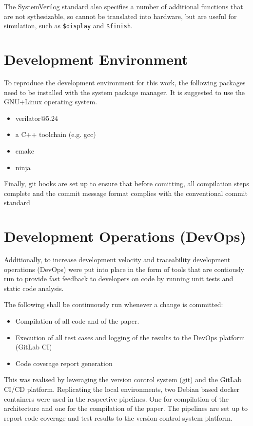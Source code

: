 The SystemVerilog standard also specifies a number of additional functions that are not sythesizable, so cannot be translated into hardware, but are useful for simulation, such as \texttt{\$display} and \texttt{\$finish}.

\section{Development Environment}
To reproduce the development environment for this work, the following packages need to be installed with the system package manager. It is suggested to use the GNU+Linux operating system. 

\begin{itemize}
  \item verilator@5.24
  \item a C++ toolchain (e.g. gcc)
  \item cmake
  \item ninja
\end{itemize}
  

Finally, git hooks are set up to ensure that before comitting, all compilation steps complete and the commit message format complies with the conventional commit standard \cite{conventionalcommit}

\section{Development Operations (DevOps)}
Additionally, to increase development velocity and traceability development operations (DevOps) were put into place in the form of tools that are contiously run to provide fast feedback to developers on code by running unit tests and static code analysis. 

The following shall be continuously run whenever a change is committed:

\begin{itemize}
  \item Compilation of all code and of the paper.  
  \item Execution of all test cases and logging of the results to the DevOps platform (GitLab CI)
  \item Code coverage report generation
\end{itemize}

This was realised by leveraging the version control system (git) and the GitLab CI/CD platform. Replicating the local environments, two Debian based docker containers \cite{dockerVerilator} \cite{dockerLatex} were used in the respective pipelines. One for compilation of the architecture and one for the compilation of the paper. The pipelines are set up to report code coverage and test results to the version control system platform. 

